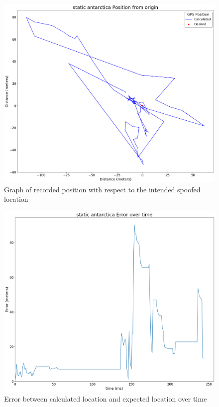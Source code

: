 \begin{figure}[H]
    \begin{centering}
        \includegraphics[width=14cm,keepaspectratio]{Figures/2021_3_30_static_antarctica Position from origin.png}
        \caption{Graph of recorded position with respect to the intended spoofed location}
        \label{fig:antarcticaStaticPosition}
    \end{centering}
\end{figure}

\begin{figure}[H]
    \begin{centering}
        \includegraphics[width=14cm,keepaspectratio]{Figures/2021_3_30_static_antarctica error over time.png}
        \caption{Error between calculated location and expected location over time}
        \label{fig:antarcticaStaticError}
    \end{centering}
\end{figure}

